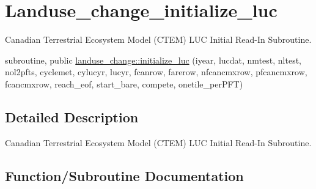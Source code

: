 \hypertarget{group__landuse__change__initialize__luc}{}\section{Landuse\+\_\+change\+\_\+initialize\+\_\+luc}
\label{group__landuse__change__initialize__luc}


Canadian Terrestrial Ecosystem Model (C\+T\+E\+M) L\+U\+C Initial Read-\/\+In Subroutine.  


\begin{DoxyCompactItemize}
\item 
subroutine, public \hyperlink{group__landuse__change__initialize__luc_gaaeec2aeebe84601010ea8cedab85c4c0}{landuse\+\_\+change\+::initialize\+\_\+luc} (iyear, lucdat, nmtest, nltest, nol2pfts, cyclemet, cylucyr, lucyr, fcanrow, farerow, nfcancmxrow, pfcancmxrow, fcancmxrow, reach\+\_\+eof, start\+\_\+bare, compete, onetile\+\_\+per\+P\+F\+T)
\end{DoxyCompactItemize}


\subsection{Detailed Description}
Canadian Terrestrial Ecosystem Model (C\+T\+E\+M) L\+U\+C Initial Read-\/\+In Subroutine. 



\subsection{Function/\+Subroutine Documentation}
\hypertarget{group__landuse__change__initialize__luc_gaaeec2aeebe84601010ea8cedab85c4c0}{}
